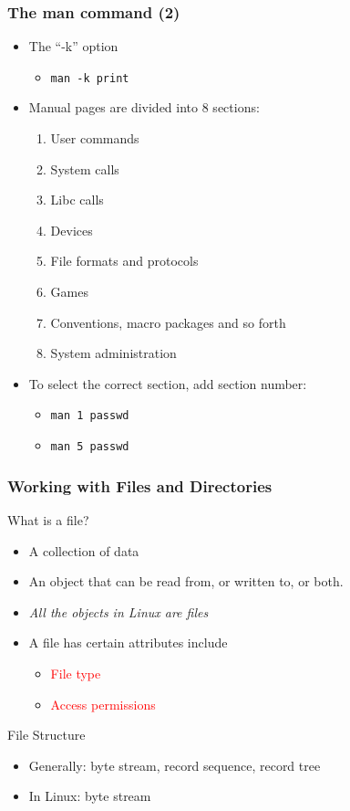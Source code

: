 \documentclass[red]{beamer}
\begin{document}
\begin{CJK*}{UTF8}{gbsn}
\begin{frame}
\frametitle{The man command (2)}
\begin{itemize}
    \item The ``-k'' option
    \begin{itemize}
        \item \lstinline{man -k print}
    \end{itemize}
    \item Manual pages are divided into 8 sections:
    \begin{enumerate}
        \item User commands
        \item System calls
        \item Libc calls
        \item Devices
        \item File formats and protocols
        \item Games
        \item Conventions, macro packages and so forth
        \item System administration
    \end{enumerate}
    \item To select the correct section, add section number:
    \begin{itemize}
        \item \lstinline{man 1 passwd}
        \item \lstinline{man 5 passwd}
    \end{itemize}
\end{itemize}
\end{frame}

\begin{frame}
\frametitle{Working with Files and Directories}
\begin{block}{What is a file?}
\begin{itemize}
    \item A collection of data
    \item An object that can be read from, or written to, or both.
    \item \emph{All the objects in Linux are files}
    \item A file has certain attributes include
    \begin{itemize}
        \item \textcolor{red}{File type}
        \item \textcolor{red}{Access permissions}
    \end{itemize}
\end{itemize}
\end{block}
\begin{block}{File Structure}
\begin{itemize}
    \item Generally: byte stream, record sequence, record tree
    \item In Linux: byte stream
\end{itemize}
\end{block}
\end{frame}


\end{CJK*}
\end{document}
